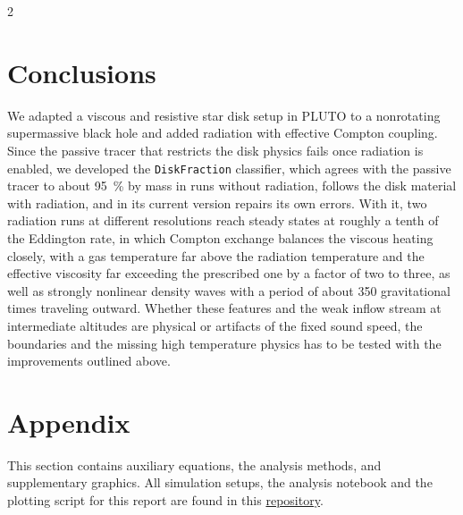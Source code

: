 \begin{multicols}{2}
	\section{Conclusions}

	We adapted a viscous and resistive star disk setup in PLUTO to a nonrotating supermassive black hole and added radiation with
	effective Compton coupling. Since the passive tracer that restricts the disk physics fails once radiation is enabled, we developed the
	\texttt{DiskFraction} classifier, which agrees with the passive tracer to about \qty{95}{\percent} by mass in runs without radiation, follows the
	disk material with radiation, and in its current version repairs its own errors. With it, two radiation runs at different
	resolutions reach steady states at roughly a tenth of the Eddington rate, in which Compton exchange balances the viscous heating
	closely, with a gas temperature far above the radiation temperature and the effective viscosity far exceeding the prescribed one by a factor
	of two to three, as well as strongly nonlinear density waves with a period of about \num{350} gravitational times traveling outward.
	Whether these features and the weak inflow stream at intermediate altitudes are physical or artifacts of the fixed sound speed,
	the boundaries and the missing high temperature physics has to be tested with the improvements outlined above.

	\end{multicols}
	\newpage
	\renewcommand{\thesubsection}{\Alph{subsection}}
	\label{sec:appendix}
		\printbibliography

		\section*{Appendix}

		\setcounter{page}{1}

		This section contains auxiliary equations, the analysis methods, and supplementary graphics. All
		simulation setups, the analysis notebook and the plotting script for this report are found in this
		\href{https://github.com/fritzali/notes/tree/main/CAMK}{repository}.
		\vspace{\baselineskip}

